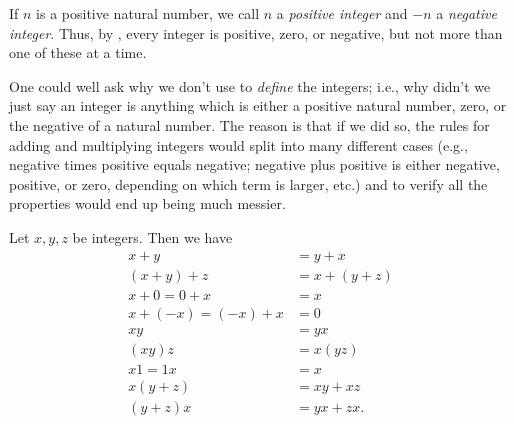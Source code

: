\begin{note}
  If \(n\) is a positive natural number, we call \(n\) a \emph{positive integer} and \(-n\) a \emph{negative integer}.
  Thus, by , every integer is positive, zero, or negative, but not more than one of these at a time.
\end{note}

\begin{note}
  One could well ask why we don't use  to \emph{define} the integers;
  i.e., why didn't we just say an integer is anything which is either a positive natural number, zero, or the negative of a natural number.
  The reason is that if we did so, the rules for adding and multiplying integers would split into many different cases (e.g., negative times positive equals negative; negative plus positive is either negative, positive, or zero, depending on which term is larger, etc.) and to verify all the properties would end up being much messier.
\end{note}

\begin{prop}\label{i:4.1.6}
  Let \(x, y, z\) be integers.
  Then we have
  \begin{align*}
    x + y               & = y + x       \\
    (x + y) + z         & = x + (y + z) \\
    x + 0 = 0 + x       & = x           \\
    x + (-x) = (-x) + x & = 0           \\
    xy                  & = yx          \\
    (xy)z               & = x(yz)       \\
    x1 = 1x             & = x           \\
    x(y + z)            & = xy + xz     \\
    (y + z)x            & = yx + zx.
  \end{align*}
\end{prop}

